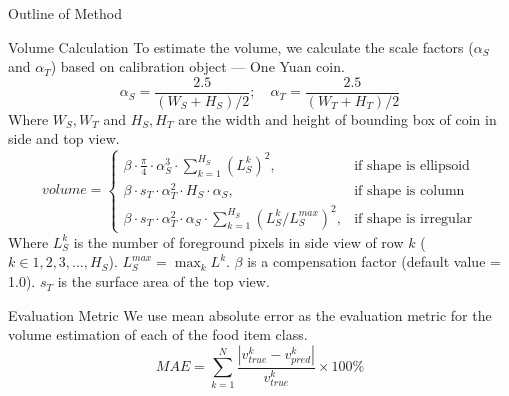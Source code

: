 \documentclass{beamer}
\begin{document}
	\begin{frame}{Outline of Method}
		\begin{block}{Volume Calculation}\tiny
			To estimate the volume\cite{vol}, we calculate the scale factors ($\alpha_S$ and $\alpha_T$) based on calibration object --- One Yuan coin.
			\begin{equation}
				\alpha_S = \frac{2.5}{(W_S + H_S)/2}; \quad
				\alpha_T = \frac{2.5}{(W_T + H_T)/2}
			\end{equation}
			Where $W_S, W_T$ and $H_S, H_T$ are the width and height of bounding box of coin in side and top view.
			\begin{equation}\label{E:vol}
				volume = 
				\begin{cases}
					\beta \cdot \frac{\pi}{4} \cdot \alpha_S^3 \cdot \sum_{k=1}^{H_S} (L^k_S)^2, &\text{if shape is ellipsoid} \\
					\beta \cdot  s_T \cdot \alpha_T^2 \cdot H_S \cdot \alpha_S, &\text{if shape is column} \\
					\beta \cdot  s_T \cdot \alpha_T^2 \cdot \alpha_S \cdot \sum_{k=1}^{H_S} \left(L^k_S/L_S^{max}\right)^2, &\text{if shape is irregular} 
				\end{cases}
			\end{equation}
			Where $L^k_S$ is the number of foreground pixels in side view of row $k$ ($k \in 1, 2, 3, \dots , H_S$). $L^{max}_S = \max_{k} L^k$. $\beta$ is a compensation factor (default value = 1.0).  $s_T$ is the surface area of the top view.
		\end{block}\pause
		\begin{block}{Evaluation Metric}\tiny
			We use mean absolute error as the evaluation metric for the volume estimation of each of the food item class.
			\begin{equation}
				MAE = \sum_{k=1}^{N} \frac{|v_{true}^k-v_{pred}^k|}{v_{true}^k}\times 100 \%
			\end{equation}
		\end{block}
	\end{frame}
	
\end{document}
